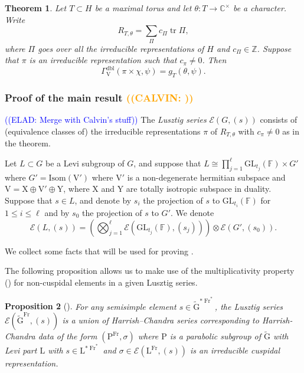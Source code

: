 \documentclass[12pt, reqno]{amsart}
\newtheorem{theorem}{Theorem}[section]
\newtheorem{proposition}[theorem]{Proposition}
\theoremstyle{definition}
\theoremstyle{definition}
\theoremstyle{definition}
\newcommand{\zIntegers}{\mathbb{Z}}
\newcommand{\cComplex}{\mathbb{C}}
\newcommand{\multiplicativegroup}[1]{#1^{\times}}
\newcommand{\hermitianSpace}{\mathrm{V}}
\newcommand{\xIsotropic}{\mathrm{X}}
\newcommand{\yIsotropic}{\mathrm{Y}}
\newcommand{\fieldCharacter}{\psi}
\newcommand{\trace}{\operatorname{tr}}
\newcommand{\GL}{\mathrm{GL}}
\newcommand{\GroupExtension}[1]{\widetilde{#1}}
\newcommand{\finiteField}{\mathbb{F}}
\newcommand{\Frobenius}{\operatorname{Fr}}
\newcommand{\dblGammaFactorSpace}[4]{\Gamma^{\mathrm{dbl}}_{#1}\left(#2 \times #3, #4\right)}
\newcommand{\IsometryGroup}{\mathrm{Isom}}
\newcommand{\algebraicGroup}[1]{\boldsymbol{\mathrm{#1}}}
\newcommand{\LusztigSeries}[2]{\mathcal{E}\left(#1, (#2)\right)}
\newcommand{\DualFrobeniusFixedPoints}[2][\Frobenius^{\ast}]{\algebraicGroup{#2}^{\ast #1}}
\newcommand{\FrobeniusFixedPoints}[2][\Frobenius]{\algebraicGroup{#2}^{#1}}
\newcommand{\calvin}[1]{\textcolor{orange}{\sffamily ((CALVIN: #1))}}
\newcommand{\elad}[1]{\textcolor{blue}{\sffamily ((ELAD: #1))}}
\begin{document}
\begin{theorem}\label{thm:doubling-method-gamma-factor-for-deligne-lusztig}
	Let $T \subset H$ be a maximal torus and let $\theta \colon T \to \multiplicativegroup{\cComplex}$ be a character. Write $$R_{T,\theta} = \sum_{\Pi} c_{\Pi} \trace \Pi,$$
	where $\Pi$ goes over all the irreducible representations of $H$ and $c_{\Pi} \in \zIntegers$. Suppose that $\pi$ is an irreducible representation such that $c_{\pi} \ne 0$. Then $$\dblGammaFactorSpace{\hermitianSpace}{\pi}{\chi}{\fieldCharacter} = g_T\left(\theta, \fieldCharacter\right).$$
\end{theorem}
\subsubsection{Proof of the main result \calvin{}}

\elad{Merge with Calvin's stuff}
The \emph{Lusztig series} $\LusztigSeries{G}{s}$ consists of (equivalence classes of) the irreducible representations $\pi$ of $R_{T, \theta}$ with $c_{\pi} \ne 0$ as in the theorem.

Let $L \subset G$ be a Levi subgroup of $G$, and suppose that $L \cong \prod_{j=1}^\ell \GL_{t_j}\left(\finiteField\right) \times G'$ where $G' = \IsometryGroup\left(\hermitianSpace'\right)$ where $\hermitianSpace'$ is a non-degenerate hermitian subspace and $\hermitianSpace = \xIsotropic \oplus \hermitianSpace' \oplus \yIsotropic$, where $\xIsotropic$ and $\yIsotropic$ are totally isotropic subspace in duality. Suppose that $s \in L$, and denote by $s_i$ the projection of $s$ to $\GL_{t_i}\left(\finiteField\right)$ for $1 \le i \le \ell$ and by $s_0$ the projection of $s$ to $G'$. We denote
$$\LusztigSeries{L}{s} = \left(\bigotimes_{j=1}^{\ell} \LusztigSeries{\GL_{t_j}\left(\finiteField\right)}{s_j}\right) \otimes \LusztigSeries{G'}{s_0}.$$

We collect some facts that will be used for proving .

The following proposition allows us to make use of the multiplicativity property () for non-cuspidal elements in a given Lusztig series.
\begin{proposition}[{\cite[Proof of Corollary 3.3.21]{GeckMalle2020}}]
	For any semisimple element $s \in \DualFrobeniusFixedPoints{\GroupExtension{G}}$, the Lusztig series $\LusztigSeries{\FrobeniusFixedPoints{\GroupExtension{G}}}{s}$ is a union of Harrish--Chandra series corresponding to Harrish-Chandra data of the form $\left(\FrobeniusFixedPoints{\algebraicGroup{P}},\sigma\right)$ where $\algebraicGroup{P}$ is a parabolic subgroup of $\algebraicGroup{\GroupExtension{G}}$ with Levi part $\algebraicGroup{L}$ with $s \in \DualFrobeniusFixedPoints{L}$ and $\sigma \in \LusztigSeries{\FrobeniusFixedPoints{L}}{s}$ is an irreducible cuspidal representation.
\end{proposition}
\end{document}
